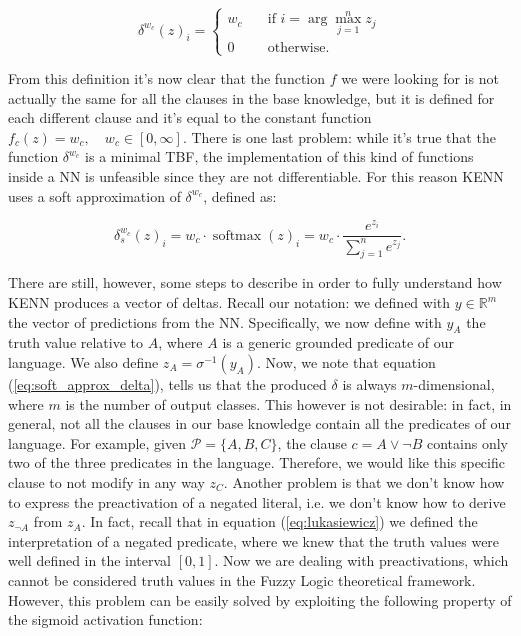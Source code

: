 \begin{equation*}
\delta^{w_c}(z)_i = 
\begin{cases}
w_c \quad &\text{if } i = \arg\max_{j=1}^nz_j \\
0 \quad &\text{otherwise.}
\end{cases}
\end{equation*}

From this definition it's now clear that the function $f$ we were looking for is not actually the same for all the clauses in the base knowledge, but it is defined for each different clause and it's equal to the constant function $f_c(z) = w_c, \quad w_c \in \left[0, \infty\right]$. 
There is one last problem: while it's true that the function $\delta^{w_c}$ is a minimal TBF, the implementation of this kind of functions inside a NN is unfeasible since they are not differentiable. For this reason KENN uses a soft approximation of $\delta^{w_c}$, defined as:

\begin{equation}
\delta_s^{w_c}(z)_i = w_c \cdot \operatorname{softmax}(z)_i = w_c \cdot \frac{e^{z_i}}{\sum_{j=1}^ne^{z_j}}.
\label{eq:soft_approx_delta}
\end{equation}

There are still, however, some steps to describe in order to fully understand how KENN produces a vector of deltas. Recall our notation: we defined with $y \in \mathbb{R}^m$ the vector of predictions from the NN. Specifically, we now define with $y_A$ the truth value relative to $A$, where $A$ is a generic grounded predicate of our language. We also define $z_A=\sigma^{-1}(y_A)$. Now, we note that equation (\ref{eq:soft_approx_delta}), tells us that the produced $\delta$ is always $m$-dimensional, where $m$ is the number of output classes. This however is not desirable: in fact, in general, not all the clauses in our base knowledge contain all the predicates of our language. For example, given $\mathcal{P}=\{A,B,C\}$, the clause $c = A \vee \neg B$ contains only two of the three predicates in the language. Therefore, we would like this specific clause to not modify in any way $z_C$. Another problem is that we don't know how to express the preactivation of a negated literal, i.e. we don't know how to derive $z_{\neg A}$ from $z_A$. In fact, recall that in equation (\ref{eq:lukasiewicz}) we defined the interpretation of a negated predicate, where we knew that the truth values were well defined in the interval $\left[0,1\right]$. Now we are dealing with preactivations, which cannot be considered truth values in the Fuzzy Logic theoretical framework. However, this problem can be easily solved by exploiting the following property of the sigmoid activation function:

